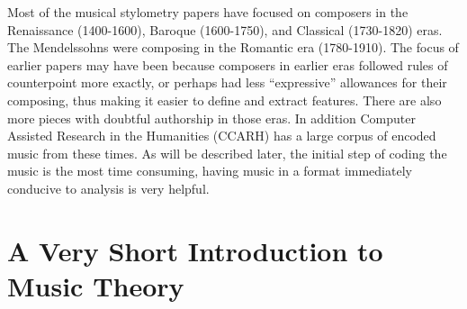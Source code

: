 \documentclass[12pt,twoside]{reedthesis}
\theoremstyle{definition}
\theoremstyle{definition}
\theoremstyle{definition}
\theoremstyle{remark}
\begin{document}
Most of the musical stylometry papers have focused on composers in the
Renaissance (1400-1600), Baroque (1600-1750), and Classical (1730-1820)
eras. The Mendelssohns were composing in the Romantic era (1780-1910).
The focus of earlier papers may have been because composers in earlier
eras followed rules of counterpoint more exactly, or perhaps had less
``expressive'' allowances for their composing, thus making it easier to
define and extract features. There are also more pieces with doubtful
authorship in those eras. In addition Computer Assisted Research in the
Humanities (CCARH) has a large corpus of encoded music from these times.
As will be described later, the initial step of coding the music is the
most time consuming, having music in a format immediately conducive to
analysis is very helpful.

\section{A Very Short Introduction to Music
Theory}\label{a-very-short-introduction-to-music-theory}
\end{document}
